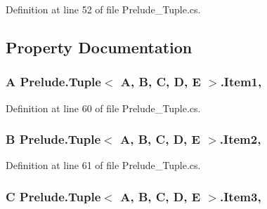 Definition at line 52 of file Prelude\+\_\+\+Tuple.\+cs.



\subsection{Property Documentation}
\hypertarget{class_prelude_1_1_tuple_3_01_a_00_01_b_00_01_c_00_01_d_00_01_e_01_4_a5397a56c1b2d4914ad4adbd95fed35a5}{
\subsubsection[{Item1}]{\setlength{\rightskip}{0pt plus 5cm}A Prelude.\+Tuple$<$ A, B, C, D, E $>$.Item1\hspace{0.3cm}{\ttfamily [get]}, {\ttfamily [set]}}}\label{class_prelude_1_1_tuple_3_01_a_00_01_b_00_01_c_00_01_d_00_01_e_01_4_a5397a56c1b2d4914ad4adbd95fed35a5}


Definition at line 60 of file Prelude\+\_\+\+Tuple.\+cs.

\hypertarget{class_prelude_1_1_tuple_3_01_a_00_01_b_00_01_c_00_01_d_00_01_e_01_4_a673868ea1ddededa034ba7b745e04d90}{
\subsubsection[{Item2}]{\setlength{\rightskip}{0pt plus 5cm}B Prelude.\+Tuple$<$ A, B, C, D, E $>$.Item2\hspace{0.3cm}{\ttfamily [get]}, {\ttfamily [set]}}}\label{class_prelude_1_1_tuple_3_01_a_00_01_b_00_01_c_00_01_d_00_01_e_01_4_a673868ea1ddededa034ba7b745e04d90}


Definition at line 61 of file Prelude\+\_\+\+Tuple.\+cs.

\hypertarget{class_prelude_1_1_tuple_3_01_a_00_01_b_00_01_c_00_01_d_00_01_e_01_4_acf532e5def7b6d4352eb806855bd929b}{
\subsubsection[{Item3}]{\setlength{\rightskip}{0pt plus 5cm}C Prelude.\+Tuple$<$ A, B, C, D, E $>$.Item3\hspace{0.3cm}{\ttfamily [get]}, {\ttfamily [set]}}}\label{class_prelude_1_1_tuple_3_01_a_00_01_b_00_01_c_00_01_d_00_01_e_01_4_acf532e5def7b6d4352eb806855bd929b}


